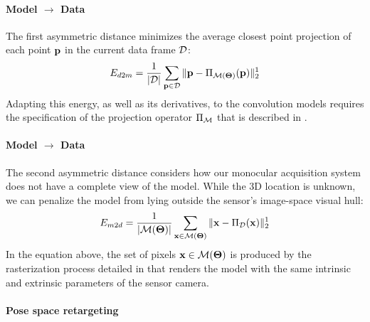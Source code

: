 \paragraph{Model $\rightarrow$ Data}
The first asymmetric distance minimizes the average closest point projection of each point $\mathbf{p}$ in the current data frame $\mathcal{D}$:
%
\begin{equation}
E_{d2m} = \frac{1}{|\mathcal{D}|}\sum_{\mathbf{p} \in \mathcal{D}} \| \mathbf{p} - \Pi_{\mathcal{M}(\boldsymbol{\Theta})}(\mathbf{p})\|_2^1
\label{eq:d2m}
\end{equation}
% 
Adapting this energy, as well as its derivatives, to the convolution models requires the specification of the projection operator $\Pi_{\mathcal{M}}$ that is described in .

\paragraph{Model $\rightarrow$ Data}
The second asymmetric distance considers how our monocular acquisition system does not have a complete view of the model. While the 3D location is unknown, we can penalize the model from lying outside the sensor's image-space visual hull:
\begin{equation}
E_{m2d} = \frac{1}{|\mathcal{M}(\boldsymbol{\Theta})|} \sum_{\mathbf{x} \in \mathcal{M}(\boldsymbol{\Theta})} \| \mathbf{x} - \Pi_{\mathcal{D}}(\mathbf{x})\|_2^1
\label{eq:m2d}
\end{equation}
In the equation above, the set of pixels $\mathbf{x} \in \mathcal{M}(\boldsymbol{\Theta})$ is produced by the rasterization process detailed in  that renders the model with the same intrinsic and extrinsic parameters of the sensor camera. 

\paragraph{Pose space retargeting}
